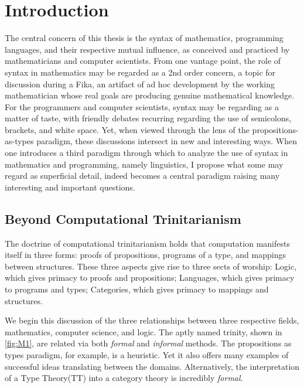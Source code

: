 \section{Introduction}
\label{sec:intro}

The central concern of this thesis is the syntax of mathematics, programming
languages, and their respective mutual influence, as conceived and practiced by
mathematicians and computer scientists.  From one vantage point, the role of
syntax in mathematics may be regarded as a 2nd order concern, a topic for
discussion during a Fika, an artifact of ad hoc development by the working
mathematician whose real goals are producing genuine mathematical knowledge.
For the programmers and computer scientists, syntax may be regarding as a
matter of taste, with friendly debates recurring regarding the use of
semicolons, brackets, and white space.  Yet, when viewed through the lens of
the propositions-as-types paradigm, these discussions intersect in new and
interesting ways.  When one introduces a third paradigm through which to
analyze the use of syntax in mathematics and programming, namely linguistics, I
propose what some may regard as superficial detail, indeed becomes a central
paradigm raising many interesting and important questions. 


\subsection{Beyond Computational Trinitarianism}

\begin{displayquote}

The doctrine of computational trinitarianism holds that computation manifests
itself in three forms: proofs of propositions, programs of a type, and mappings
between structures. These three aspects give rise to three sects of worship:
Logic, which gives primacy to proofs and propositions; Languages, which gives
primacy to programs and types; Categories, which gives primacy to mappings and
structures.\cite{harperTrinity}
\end{displayquote}

We begin this discussion of the three relationships between three respective
fields, mathematics, computer science, and logic. The aptly named 
trinity, shown in \autoref{fig:M1}, are related via both \emph{formal} and \emph{informal}
methods. The propositions as types paradigm, for example, is a heuristic. Yet
it also offers many examples of successful ideas translating between the domains.
Alternatively, the interpretation of a Type Theory(TT) into a category theory is
incredibly \emph{formal}.


